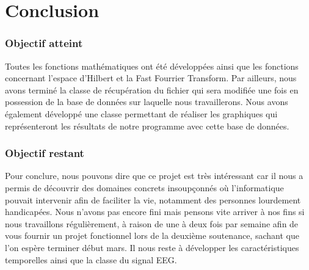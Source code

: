 \part{Conclusion}
	
	\section{Objectif atteint} %

		Toutes les fonctions mathématiques ont été développées ainsi que les fonctions concernant l'espace d'Hilbert et la Fast Fourrier Transform. Par ailleurs, nous avons terminé la classe de récupération du fichier qui sera modifiée une fois en possession de la base de données sur laquelle nous travaillerons. Nous avons également développé une classe permettant de réaliser les graphiques qui représenteront les résultats de notre programme avec cette base de données. 	
	
	\label{sec:objectif_atteint}
	
	\section{Objectif restant} %
	\label{sec:objectif_restant}
	
	Pour conclure, nous pouvons dire que ce projet est très intéressant car il nous a permis de découvrir des domaines concrets insoupçonnés où l'informatique pouvait intervenir afin de faciliter la vie, notamment des personnes lourdement handicapées. Nous n'avons pas encore fini mais pensons vite arriver à nos fins si nous travaillons régulièrement, à raison de une à deux fois par semaine afin de vous fournir un projet fonctionnel lors de la deuxième soutenance, sachant que l'on espère terminer début mars.
	Il nous reste à développer les caractéristiques temporelles ainsi que la classe du signal EEG. 